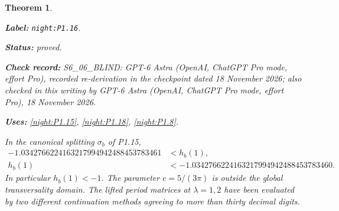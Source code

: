 \documentclass[11pt,a4paper]{article}
\newtheorem{theorem}{Theorem}[section]
\theoremstyle{definition}
\newcommand{\StatementRecord}[4]{\par\smallskip\begingroup\upshape\raggedright\noindent\textbf{Label:} \nolinkurl{#1}.\par\noindent\textbf{Status:} #2.\par\noindent\textbf{Check record:} #3.\par\noindent\textbf{Uses:} #4.\par\endgroup\smallskip}
\newcommand{\CurrentChecker}{GPT-6 Astra (OpenAI, ChatGPT Pro mode, effort Pro), 18 November 2026}
\begin{document}
\begin{theorem}\label{night:P1.16}
\StatementRecord{night:P1.16}{proved}{S6\_06\_BLIND: GPT-6 Astra (OpenAI, ChatGPT Pro mode, effort Pro), recorded re-derivation in the checkpoint dated 18 November 2026; also checked in this writing by \CurrentChecker}{\cref{night:P1.15}, \cref{night:P1.18}, \cref{night:P1.8}}
In the canonical splitting $\sigma_b$ of P1.15,
\[
\begin{aligned}
-1.0342766224163217994942488453783461&<h_b(1),\\
h_b(1)&<-1.0342766224163217994942488453783460.
\end{aligned}
\]
In particular $h_b(1)<-1$.  The parameter $c=5/(3\pi)$ is outside the
global transversality domain.  The lifted period matrices at
$\lambda=1,2$ have been evaluated by two different continuation methods
agreeing to more than thirty decimal digits.
\end{theorem}
\end{document}
